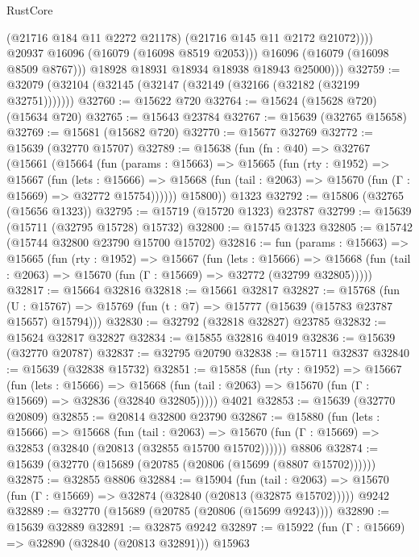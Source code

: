 \begin{lexlean}{RustCore}
\begin{coremodule}
                    (@21716 @184 @11 @2272 @21178)
                    (@21716 @145 @11 @2172 @21072))))
              @20937
              @16096
              (@16079 (@16098 @8519 @2053)))
            @16096
            (@16079 (@16098 @8509 @8767)))
          @18928
          @18931
          @18934
          @18938
          @18943
          @25000)))
@32759 := @32079 (@32104 (@32145 (@32147 (@32149 (@32166 (@32182 (@32199 @32751)))))))
@32760 := @15622 @720
@32764 := @15624 (@15628 @720) (@15634 @720)
@32765 := @15643 @23784
@32767 := @15639 (@32765 @15658)
@32769 := @15681 (@15682 @720)
@32770 := @15677 @32769
@32772 := @15639 (@32770 @15707)
@32789 := @15638
    (fun (fn : @40) =>
    @32767
      (@15661
        (@15664
          (fun (params : @15663) =>
          @15665
            (fun (rty : @1952) =>
            @15667
              (fun (lets : @15666) =>
              @15668 (fun (tail : @2063) => @15670 (fun (Γ : @15669) => @32772 @15754))))))
        @15800))
    @1323
@32792 := @15806 (@32765 (@15656 @1323))
@32795 := @15719 (@15720 @1323) @23787
@32799 := @15639 (@15711 (@32795 @15728) @15732)
@32800 := @15745 @1323
@32805 := @15742 (@15744 @32800 @23790 @15700 @15702)
@32816 := fun (params : @15663) =>
  @15665
    (fun (rty : @1952) =>
    @15667
      (fun (lets : @15666) =>
      @15668 (fun (tail : @2063) => @15670 (fun (Γ : @15669) => @32772 (@32799 @32805)))))
@32817 := @15664 @32816
@32818 := @15661 @32817
@32827 := @15768
    (fun (U : @15767) => @15769 (fun (t : @7) => @15777 (@15639 (@15783 @23787 @15657) @15794)))
@32830 := @32792 (@32818 @32827) @23785
@32832 := @15624 @32817 @32827
@32834 := @15855 @32816 @4019
@32836 := @15639 (@32770 @20787)
@32837 := @32795 @20790
@32838 := @15711 @32837
@32840 := @15639 (@32838 @15732)
@32851 := @15858
    (fun (rty : @1952) =>
    @15667
      (fun (lets : @15666) =>
      @15668 (fun (tail : @2063) => @15670 (fun (Γ : @15669) => @32836 (@32840 @32805)))))
    @4021
@32853 := @15639 (@32770 @20809)
@32855 := @20814 @32800 @23790
@32867 := @15880
    (fun (lets : @15666) =>
    @15668
      (fun (tail : @2063) =>
      @15670 (fun (Γ : @15669) => @32853 (@32840 (@20813 (@32855 @15700 @15702))))))
    @8806
@32874 := @15639 (@32770 (@15689 (@20785 (@20806 (@15699 (@8807 @15702))))))
@32875 := @32855 @8806
@32884 := @15904
    (fun (tail : @2063) => @15670 (fun (Γ : @15669) => @32874 (@32840 (@20813 (@32875 @15702)))))
    @9242
@32889 := @32770 (@15689 (@20785 (@20806 (@15699 @9243))))
@32890 := @15639 @32889
@32891 := @32875 @9242
@32897 := @15922 (fun (Γ : @15669) => @32890 (@32840 (@20813 @32891))) @15963

\end{coremodule}
\end{lexlean}
